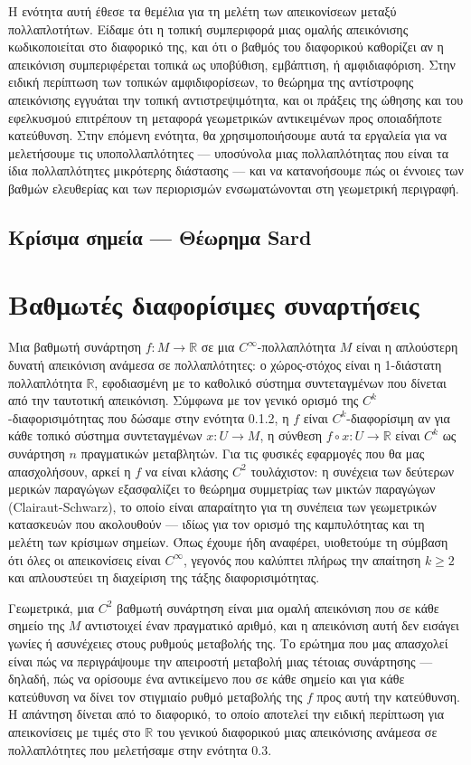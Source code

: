 \documentclass[11pt,a4paper,twoside,openright]{book}
\begin{document}
Η ενότητα αυτή έθεσε τα θεμέλια για τη μελέτη των απεικονίσεων μεταξύ πολλαπλοτήτων. Είδαμε ότι η τοπική συμπεριφορά μιας ομαλής απεικόνισης κωδικοποιείται στο διαφορικό της, και ότι ο βαθμός του διαφορικού καθορίζει αν η απεικόνιση συμπεριφέρεται τοπικά ως υποβύθιση, εμβάπτιση, ή αμφιδιαφόριση. Στην ειδική περίπτωση των τοπικών αμφιδιφορίσεων, το θεώρημα της αντίστροφης απεικόνισης εγγυάται την τοπική αντιστρεψιμότητα, και οι πράξεις της ώθησης και του εφελκυσμού επιτρέπουν τη μεταφορά γεωμετρικών αντικειμένων προς οποιαδήποτε κατεύθυνση. Στην επόμενη ενότητα, θα χρησιμοποιήσουμε αυτά τα εργαλεία για να μελετήσουμε τις υποπολλαπλότητες --- υποσύνολα μιας πολλαπλότητας που είναι τα ίδια πολλαπλότητες μικρότερης διάστασης --- και να κατανοήσουμε πώς οι έννοιες των βαθμών ελευθερίας και των περιορισμών ενσωματώνονται στη γεωμετρική περιγραφή.

\subsection{Κρίσιμα σημεία --- Θέωρημα Sard}

\section{Βαθμωτές διαφορίσιμες συναρτήσεις}

Μια βαθμωτή συνάρτηση $f: M \to \mathbb{R}$ σε μια $C^\infty$-πολλαπλότητα $M$ είναι η απλούστερη δυνατή απεικόνιση ανάμεσα σε πολλαπλότητες: ο χώρος-στόχος είναι η 1-διάστατη πολλαπλότητα $\mathbb{R}$, εφοδιασμένη με το καθολικό σύστημα συντεταγμένων που δίνεται από την ταυτοτική απεικόνιση. Σύμφωνα με τον γενικό ορισμό της $C^k$-διαφορισιμότητας που δώσαμε στην ενότητα 0.1.2, η $f$ είναι $C^k$-διαφορίσιμη αν για κάθε τοπικό σύστημα συντεταγμένων $x: U \to M$, η σύνθεση $f \circ x: U \to \mathbb{R}$ είναι $C^k$ ως συνάρτηση $n$ πραγματικών μεταβλητών. Για τις φυσικές εφαρμογές που θα μας απασχολήσουν, αρκεί η $f$ να είναι κλάσης $C^2$ τουλάχιστον: η συνέχεια των δεύτερων μερικών παραγώγων εξασφαλίζει το θεώρημα συμμετρίας των μικτών παραγώγων (Clairaut-Schwarz), το οποίο είναι απαραίτητο για τη συνέπεια των γεωμετρικών κατασκευών που ακολουθούν --- ιδίως για τον ορισμό της καμπυλότητας και τη μελέτη των κρίσιμων σημείων. Όπως έχουμε ήδη αναφέρει, υιοθετούμε τη σύμβαση ότι όλες οι απεικονίσεις είναι $C^\infty$, γεγονός που καλύπτει πλήρως την απαίτηση $k \geq 2$ και απλουστεύει τη διαχείριση της τάξης διαφορισιμότητας.

Γεωμετρικά, μια $C^2$ βαθμωτή συνάρτηση είναι μια ομαλή απεικόνιση που σε κάθε σημείο της $M$ αντιστοιχεί έναν πραγματικό αριθμό, και η απεικόνιση αυτή δεν εισάγει γωνίες ή ασυνέχειες στους ρυθμούς μεταβολής της. Το ερώτημα που μας απασχολεί είναι πώς να περιγράψουμε την απειροστή μεταβολή μιας τέτοιας συνάρτησης --- δηλαδή, πώς να ορίσουμε ένα αντικείμενο που σε κάθε σημείο και για κάθε κατεύθυνση να δίνει τον στιγμιαίο ρυθμό μεταβολής της $f$ προς αυτή την κατεύθυνση. Η απάντηση δίνεται από το διαφορικό, το οποίο αποτελεί την ειδική περίπτωση για απεικονίσεις με τιμές στο $\mathbb{R}$ του γενικού διαφορικού μιας απεικόνισης ανάμεσα σε πολλαπλότητες που μελετήσαμε στην ενότητα 0.3.
\end{document}

